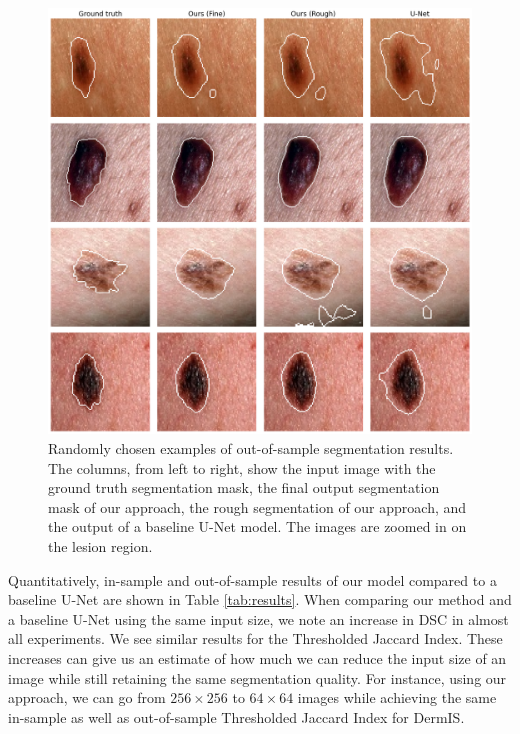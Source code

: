 \begin{figure}[t!]
\centering
\includegraphics[width=\textwidth]{images/5/e2e/visual_results.png}
\caption{Randomly chosen examples of out-of-sample segmentation results. The columns, from left to right, show the input image with the ground truth segmentation mask, the final output segmentation mask of our approach, the rough segmentation of our approach, and the output of a baseline U-Net model. The images are zoomed in on the lesion region.} \label{fig:visual}
\end{figure}

Quantitatively, in-sample and out-of-sample results of our model compared to a baseline U-Net are shown in Table \ref{tab:results}. When comparing our method and a baseline U-Net using the same input size, we note an increase in DSC in almost all experiments. We see similar results for the Thresholded Jaccard Index. These increases can give us an estimate of how much we can reduce the input size of an image while still retaining the same segmentation quality. For instance, using our approach, we can go from $256 \times 256$ to $64 \times 64$ images while achieving the same in-sample as well as out-of-sample Thresholded Jaccard Index for DermIS.

